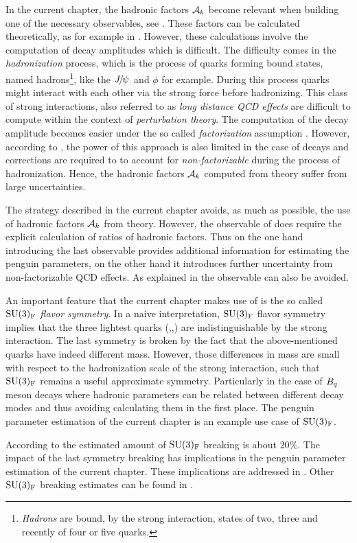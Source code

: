 In the current chapter, the hadronic factors $\mathcal{A}_{k}$ become relevant when building
one of the necessary observables, see . These factors can be calculated
theoretically, as for example in \cite{DeBruyn-thesis}. However, these calculations involve
the computation of \BJpsiX decay amplitudes which is difficult. The difficulty comes in the
{\it hadronization} process, which is the process of quarks forming bound states, named
hadrons\footnote{ {\it Hadrons} are bound, by the strong interaction, states of two,
three and recently \cite{Aaij:2016nsc} of four or five quarks.}, like the ${J\mskip -3mu/\mskip -2mu\psi\mskip 2mu}$ and $\phi$ for example.
During this process quarks might interact with each other via the strong force before hadronizing.
This class of strong interactions, also referred to as {\it long distance QCD effects}
are difficult to compute within the context of {\it perturbation theory}.
The computation of the \BJpsiX decay amplitude becomes easier under the so called
{\it factorization} assumption \cite{HAAN1970448,Wirbel1985,CABIBBO1978418,FAKIROV1978315}.
However, according to \cite{DeBruyn-thesis},
the power of this approach is also limited in the case of \BJpsiX decays and corrections
are required to to account for {\it non-factorizable} during the process of hadronization.
Hence, the hadronic factors $\mathcal{A}_{k}$ computed from theory suffer from large uncertainties.

The strategy described in the current chapter avoids, as much as possible, the use of hadronic
factors $\mathcal{A}_{k}$ from theory. However, the observable of 
does require the explicit calculation of ratios of hadronic factors. Thus on the one hand
introducing the last observable provides additional information for estimating the penguin
parameters, on the other hand it introduces further uncertainty from non-factorizable QCD effects.
As explained in  the observable  can also be avoided.

An important feature that the current chapter makes use of is the so called
$\mathrm{SU}(3)_{\rm F}$ {\it flavor symmetry}\cite{GELLMANN1964214,NEEMAN1961222}.
In a naive interpretation, $\mathrm{SU}(3)_{\rm F}$ flavor symmetry implies that the three lightest quarks (\uquark,\dquark,\squark)
are indistinguishable by the strong interaction. The last symmetry is broken by the fact that the above-mentioned
quarks have indeed different mass. However, those differences in mass are small with respect
to the hadronization scale \lqcd of the strong interaction, such that $\mathrm{SU}(3)_{\rm F}$
remains a useful approximate symmetry. Particularly in the case of $B_q$ meson decays where hadronic
parameters can be related between different decay modes and thus avoiding calculating them in the first place.
The penguin parameter estimation of the current chapter is an example use case of $\mathrm{SU}(3)_{\rm F}$.

According to \cite{Nagashima:2007qn,Gronau:2013mda} the estimated amount of $\mathrm{SU}(3)_{\rm F}$ breaking is about $20\%$.
The impact of the last symmetry breaking has implications in the penguin parameter estimation
of the current chapter. These implications are addressed in .
Other $\mathrm{SU}(3)_{\rm F}$ breaking estimates can be found in \cite{Charles:2015gya,PDG}.
